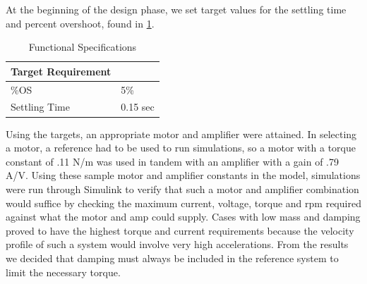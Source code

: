 At the beginning of the design phase, we set target values for the settling time and percent overshoot, found in \ref{specs}.
\begin{table}[H]
	\centering
	\caption{Functional Specifications}
	\label{specs}
	\begin{tabular}{|l|l|}
		\hline
		Target Requirement &          \\ \hline
		\%OS               & 5\%      \\ \hline
		Settling Time      & 0.15 sec \\ \hline
	\end{tabular}
\end{table}
 Using the targets, an appropriate motor and amplifier were attained. In selecting a motor, a reference had to be used to run simulations, so a motor with a torque constant of .11 N/m was used in tandem with an amplifier with a gain of .79 A/V. Using these sample motor and amplifier constants in the model, simulations were run through Simulink to verify that such a motor and amplifier combination would suffice by checking the maximum current, voltage, torque and rpm required against what the motor and amp could supply. Cases with low mass and damping proved to have the highest torque and current requirements because the velocity profile of such a system would involve very high accelerations. From the results we decided that damping must always be included in the reference system to limit the necessary torque. \par
